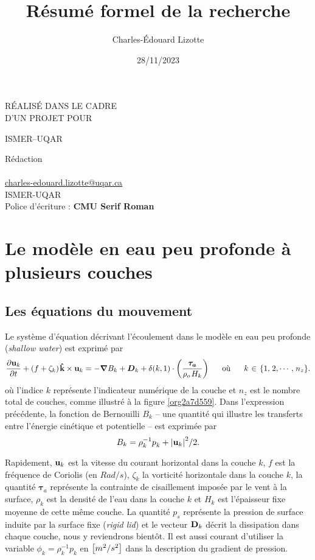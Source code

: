 \documentclass[10pt]{report}
\author{Charles-Édouard Lizotte}
\date{28/11/2023}
\title{Résumé formel de la recherche}
\makeatletter
\numberwithin{equation}{section}
\newcommand{\kvf}{\vb{\hat{k}}}
\newcommand{\uu}{\vb{u}}
\newcommand{\pt}{\hspace{1pt}} %
\newcommand{\mytitlepage}{
\begin{titlepage}
\begin{center}
{\Huge \thesubtitle \par}
\vspace{2cm}
{\Huge \MakeUppercase{\thetitle} \par}
\vspace{2cm}
RÉALISÉ DANS LE CADRE\\ D'UN PROJET POUR \par
\vspace{2cm}
{\Huge ISMER--UQAR \par}
\vspace{2cm}
{\thedate}
\end{center}
\vfill
Rédaction \\
{\theauthor}\\
\url{charles-edouard.lizotte@uqar.ca}\\
ISMER-UQAR\\
Police d'écriture : \textbf{CMU Serif Roman}
\end{titlepage}
}
\makeatother
\begin{document}
\mytitlepage
\tableofcontents\newpage


\chapter{Le modèle en eau peu profonde à plusieurs couches}
\label{sec:org5bb5a50}

\section{Les équations du mouvement}
\label{sec:org46e7285}

Le système d'équation décrivant l'écoulement dans le modèle en eau peu profonde (\emph{shallow water}) est exprimé par 
\begin{equation}
\label{eq:org08592cd}
   \pdv{\uu_k}{t} + \qty(f+\zeta_k)\pt \kvf\times\uu_k = -\gradient{B_k} + \boldsymbol{D}_k + \delta(k,1)\cdot \qty(\frac{\boldsymbol{\tau_a}}{\rho_o\pt H_k})
   \hspace{0.6cm} \text{où} \hspace{0.6cm} k\pt \in\pt \lbrace 1,\pt2,\cdots ,\pt n_z\rbrace.
\end{equation}
où l'indice \(k\) représente l'indicateur numérique de la couche et \(n_z\) est le nombre total de couches, comme illustré à la figure \ref{org2a7d559}.
Dans l'expression précédente, la fonction de Bernouilli \(B_k\) -- une quantité qui illustre les transferts entre l'énergie cinétique et potentielle -- est exprimée par
\begin{equation}
   B_k =  \rho_k^{-1} p_k^{} + \abs{\uu_k}^2/2.
\end{equation}

Rapidement, \(\uu_k\) est la vitesse du courant horizontal dans la couche \(k\), \(f\) est la fréquence de Coriolis (en \(Rad/s\)), \(\zeta_k\) la vorticité horizontale dans la couche \(k\), la quantité \(\boldsymbol{\tau}_a\) représente la contrainte de cisaillement imposée par le vent à la surface, \(\rho_k\) est la densité de l'eau dans la couche \(k\) et \(H_k\) est l'épaisseur fixe moyenne de cette même couche.
La quantité \(p_s\) représente la pression de surface induite par la surface fixe (\emph{rigid lid}) et le vecteur \(\vb{D}_k\) décrit la dissipation dans chaque couche, nous y reviendrons bientôt.
Il est aussi courant d'utiliser la variable \(\phi_k = \rho_k^{-1} p_k\) en \(\qty[m^2/s^2]\) dans la description du gradient de pression.\bigskip
\end{document}
